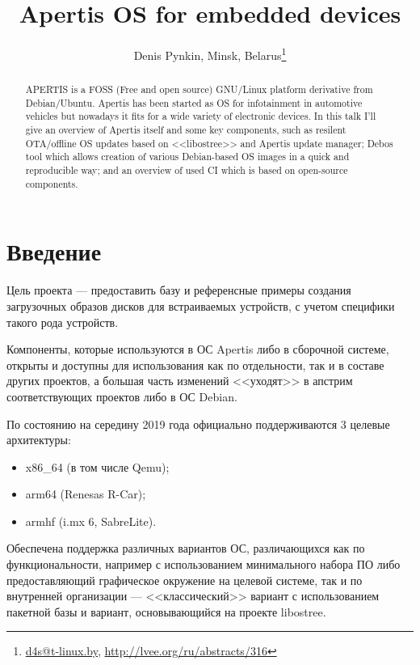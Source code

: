 \documentclass[10pt, a5paper]{article}
\begin{document}
\title{Apertis OS for embedded devices}
\author{Denis Pynkin, Minsk, Belarus\footnote{\url{d4s@t-linux.by}, \url{http://lvee.org/ru/abstracts/316}}}
\maketitle
\begin{abstract}
APERTIS is a FOSS (Free and open source) GNU/Linux \linebreak platform derivative from Debian/Ubuntu. Apertis has been \linebreak started as OS for infotainment in automotive vehicles but \linebreak nowadays it fits for a wide variety of electronic devices.
In this talk I'll give an overview of Apertis itself and some key \linebreak components, such as resilent OTA/offline OS updates based on <<libostree>> and Apertis update manager; Debos tool which allows creation of various Debian-based OS images in a quick and \linebreak reproducible way; and an overview of used CI which is based on open-source components.
\end{abstract}
\section*{Введение}

Цель проекта --- предоставить базу и референсные примеры создания загрузочных образов дисков для встраиваемых устройств, с учетом специфики такого рода устройств.

Компоненты, которые используются в ОС Apertis либо в сборочной системе, открыты и доступны для использования как по отдельности, так и в составе других проектов, а большая часть изменений <<уходят>> в апстрим соответствующих проектов либо в ОС Debian.

По состоянию на середину 2019 года официально поддерживаются 3 целевые архитектуры:
\begin{itemize}
\item x86\_64 (в том числе Qemu);
\item arm64 (Renesas R-Car);
\item armhf (i.mx 6, SabreLite).
\end{itemize}

Обеспечена поддержка различных вариантов ОС, различающихся как по функциональности, например с использованием минимального набора ПО либо предоставляющий графическое окружение на целевой системе, так и по внутренней организации --- <<классический>> вариант с использованием пакетной базы и вариант, основывающийся на проекте libostree\cite{bib2}.
\end{document}
